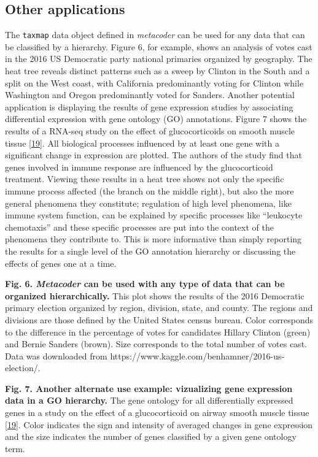 \documentclass[10pt,letterpaper]{article}
\begin{document}
\subsection*{Other applications}\label{other-applications}

The \texttt{taxmap} data object defined in \emph{metacoder} can be used
for any data that can be classified by a hierarchy. Figure 6, for
example, shows an analysis of votes cast in the 2016 US Democratic party
national primaries organized by geography. The heat tree reveals
distinct patterns such as a sweep by Clinton in the South and a split on
the West coast, with California predominantly voting for Clinton while
Washington and Oregon predominantly voted for Sanders. Another potential
application is displaying the results of gene expression studies by
associating differential expression with gene ontology (GO) annotations.
Figure 7 shows the results of a RNA-seq study on the effect of
glucocorticoids on smooth muscle tissue \hyperref[csl:19]{[19]}. All
biological processes influenced by at least one gene with a significant
change in expression are plotted. The authors of the study find that
genes involved in immune response are influenced by the glucocorticoid
treatment. Viewing these results in a heat tree shows not only the
specific immune process affected (the branch on the middle right), but
also the more general phenomena they constitute; regulation of high
level phenomena, like immune system function, can be explained by
specific processes like ``leukocyte chemotaxis'' and these specific
processes are put into the context of the phenomena they contribute to.
This is more informative than simply reporting the results for a single
level of the GO annotation hierarchy or discussing the effects of genes
one at a time.

\textbf{Fig. 6. \emph{Metacoder} can be used with any type of data that
can be organized hierarchically.} This plot shows the results of the
2016 Democratic primary election organized by region, division, state,
and county. The regions and divisions are those defined by the United
States census bureau. Color corresponds to the difference in the
percentage of votes for candidates Hillary Clinton (green) and Bernie
Sanders (brown). Size corresponds to the total number of votes cast.
Data was downloaded from
https://www.kaggle.com/benhamner/2016-us-election/.

\textbf{Fig. 7. Another alternate use example: vizualizing gene
expression data in a GO hierarchy.} The gene ontology for all
differentially expressed genes in a study on the effect of a
glucocorticoid on airway smooth muscle tissue \hyperref[csl:19]{[19]}. Color
indicates the sign and intensity of averaged changes in gene expression
and the size indicates the number of genes classified by a given gene
ontology term.
\end{document}
